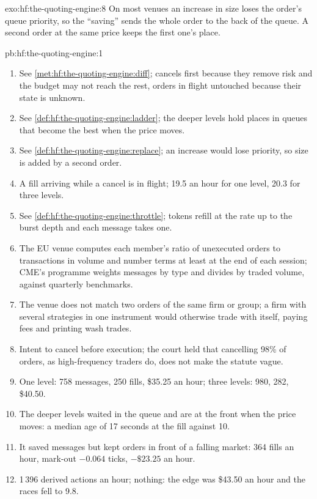 \begin{solution}{exo:hf:the-quoting-engine:8}
On most venues an increase in size loses the order's queue priority, so the ``saving'' sends the whole order to the back of the queue. A second
order at the same price keeps the first one's place.
\end{solution}

\begin{solution}{pb:hf:the-quoting-engine:1}
\begin{enumerate}
\item See \cref{met:hf:the-quoting-engine:diff}; cancels first because they remove risk and the budget may not reach the rest, orders in flight
untouched because their state is unknown.
\item See \cref{def:hf:the-quoting-engine:ladder}; the deeper levels hold places in queues that become the best when the price moves.
\item See \cref{def:hf:the-quoting-engine:replace}; an increase would lose priority, so size is added by a second order.
\item A fill arriving while a cancel is in flight; 19.5 an hour for one level, 20.3 for three levels.
\item See \cref{def:hf:the-quoting-engine:throttle}; tokens refill at the rate up to the burst depth and each message takes one.
\item The EU venue computes each member's ratio of unexecuted orders to transactions in volume and number terms at least at the end of each session;
CME's programme weights messages by type and divides by traded volume, against quarterly benchmarks.
\item The venue does not match two orders of the same firm or group; a firm with several strategies in one instrument would otherwise trade with
itself, paying fees and printing wash trades.
\item Intent to cancel before execution; the court held that cancelling 98\% of orders, as high-frequency traders do, does not make the statute
vague.
\item One level: 758 messages, 250 fills, \$35.25 an hour; three levels: 980, 282, \$40.50.
\item The deeper levels waited in the queue and are at the front when the price moves: a median age of 17 seconds at the fill against 10.
\item It saved messages but kept orders in front of a falling market: 364 fills an hour, mark-out $-0.064$ ticks, $-\$23.25$ an hour.
\item 1\,396 derived actions an hour; nothing: the edge was \$43.50 an hour and the races fell to 9.8.

\end{enumerate}
\end{solution}
